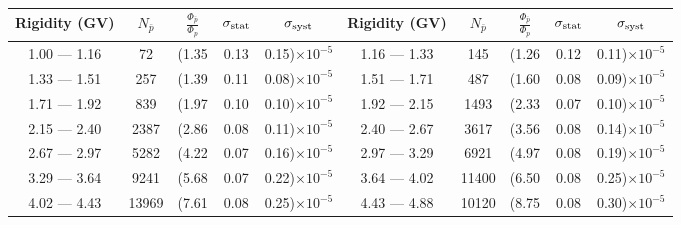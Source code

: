 \begin{table}[p] 
\renewcommand\baselinestretch{1.3}\selectfont
\setlength\tabcolsep{3pt}  %
\centering
\begin{tabular}{c|c|ccc  c|c|ccc}
\hline
\textbf{Rigidity}  (GV)  & $N_{\bar{p}}$ & $\frac{\Phi_{\bar{p}}}{\Phi_{p}}$ & $\sigma_{\rm{stat}}$ & $\sigma_{\rm{syst}}$ \hspace{1cm}  & \textbf{Rigidity}  (GV)  & $N_{\bar{p}}$ & $\frac{\Phi_{\bar{p}}}{\Phi_{p}}$ & $\sigma_{\rm{stat}}$ & $\sigma_{\rm{syst}}$ \hspace{1cm} \\ 
\hline
1.00 — 1.16  &  72                      &(1.35                                &  0.13                   &      0.15)$\times 10^{-5}$  & 1.16 — 1.33  &  145                    &(1.26                                &  0.12                   &      0.11)$\times 10^{-5}$ \\
1.33 — 1.51  &  257                    &(1.39                                &  0.11                   &      0.08)$\times 10^{-5}$  & 1.51 — 1.71  &  487                    &(1.60                                &  0.08                   &      0.09)$\times 10^{-5}$ \\
1.71 — 1.92  &  839                    &(1.97                                &  0.10                   &      0.10)$\times 10^{-5}$  & 1.92 — 2.15  &  1493                  &(2.33                                &  0.07                   &      0.10)$\times 10^{-5}$ \\
2.15 — 2.40  &  2387                  &(2.86                                &  0.08                   &      0.11)$\times 10^{-5}$  & 2.40 — 2.67  &  3617                  &(3.56                                &  0.08                   &      0.14)$\times 10^{-5}$ \\
2.67 — 2.97  &  5282                  &(4.22                                &  0.07                   &      0.16)$\times 10^{-5}$  & 2.97 — 3.29  &  6921                  &(4.97                                &  0.08                   &      0.19)$\times 10^{-5}$ \\
3.29 — 3.64  &  9241                  &(5.68                                &  0.07                   &      0.22)$\times 10^{-5}$  & 3.64 — 4.02  &  11400                &(6.50                                &  0.08                   &      0.25)$\times 10^{-5}$ \\
4.02 — 4.43  &  13969                &(7.61                                &  0.08                   &      0.25)$\times 10^{-5}$  & 4.43 — 4.88  &  10120                &(8.75                                &  0.08                   &      0.30)$\times 10^{-5}$ \\

\end{tabular}
\end{table}
